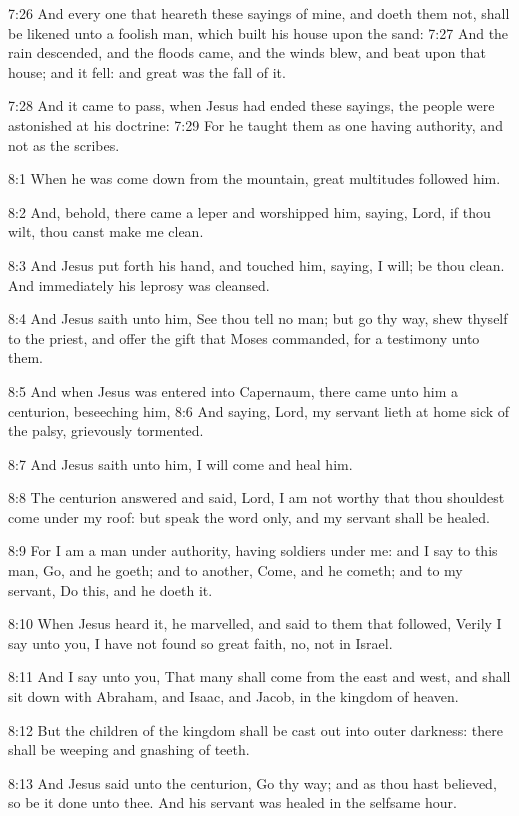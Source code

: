7:26 And every one that heareth these sayings of mine, and doeth them not, shall be likened unto a foolish man, which built his house upon the sand: 7:27 And the rain descended, and the floods came, and the winds blew, and beat upon that house; and it fell: and great was the fall of it.

7:28 And it came to pass, when Jesus had ended these sayings, the people were astonished at his doctrine: 7:29 For he taught them as one having authority, and not as the scribes.

8:1 When he was come down from the mountain, great multitudes followed him.

8:2 And, behold, there came a leper and worshipped him, saying, Lord, if thou wilt, thou canst make me clean.

8:3 And Jesus put forth his hand, and touched him, saying, I will; be thou clean. And immediately his leprosy was cleansed.

8:4 And Jesus saith unto him, See thou tell no man; but go thy way, shew thyself to the priest, and offer the gift that Moses commanded, for a testimony unto them.

8:5 And when Jesus was entered into Capernaum, there came unto him a centurion, beseeching him, 8:6 And saying, Lord, my servant lieth at home sick of the palsy, grievously tormented.

8:7 And Jesus saith unto him, I will come and heal him.

8:8 The centurion answered and said, Lord, I am not worthy that thou shouldest come under my roof: but speak the word only, and my servant shall be healed.

8:9 For I am a man under authority, having soldiers under me: and I say to this man, Go, and he goeth; and to another, Come, and he cometh; and to my servant, Do this, and he doeth it.

8:10 When Jesus heard it, he marvelled, and said to them that followed, Verily I say unto you, I have not found so great faith, no, not in Israel.

8:11 And I say unto you, That many shall come from the east and west, and shall sit down with Abraham, and Isaac, and Jacob, in the kingdom of heaven.

8:12 But the children of the kingdom shall be cast out into outer darkness: there shall be weeping and gnashing of teeth.

8:13 And Jesus said unto the centurion, Go thy way; and as thou hast believed, so be it done unto thee. And his servant was healed in the selfsame hour.

